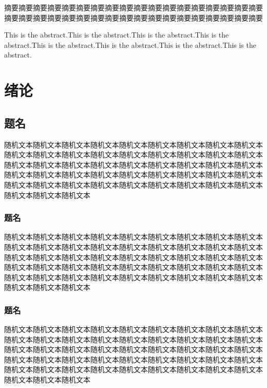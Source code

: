 \documentclass{paper}
\author{your name（三号宋体）}
\begin{document}
\maketitle
\announcement{}
\newpage
\begin{abstractcn}
摘要摘要摘要摘要摘要摘要摘要摘要摘要摘要摘要摘要摘要摘要摘要摘要摘要摘要摘要摘要摘要摘要摘要摘要摘要摘要摘要摘要摘要摘要摘要摘要摘要摘要摘要摘要

\end{abstractcn}
\newpage
{}
\begin{abstracten}
This is the abstract.This is the abstract.This is the abstract.This is the abstract.This is the abstract.This is the abstract.This is the abstract.This is the abstract.
\end{abstracten}
\newpage

{
    \xiaosihao \songti \tableofcontents
}
\newpage

\section{绪论}
\subsection{题名}
随机文本随机文本随机文本随机文本随机文本随机文本随机文本随机文本随机文本随机文本随机文本随机文本随机文本随机文本随机文本随机文本随机文本随机文本随机文本随机文本随机文本随机文本随机文本随机文本随机文本随机文本随机文本随机文本随机文本随机文本随机文本随机文本随机文本随机文本随机文本随机文本随机文本随机文本随机文本随机文本随机文本随机文本随机文本随机文本随机文本随机文本随机文本随机文本
\subsubsection{题名}
随机文本随机文本随机文本随机文本随机文本随机文本随机文本随机文本随机文本随机文本随机文本随机文本随机文本随机文本随机文本随机文本随机文本随机文本随机文本随机文本随机文本随机文本随机文本随机文本随机文本随机文本随机文本随机文本随机文本随机文本随机文本随机文本随机文本随机文本随机文本随机文本随机文本随机文本随机文本随机文本随机文本随机文本随机文本随机文本随机文本随机文本随机文本随机文本
\subsubsection{题名}
随机文本随机文本随机文本随机文本随机文本随机文本随机文本随机文本随机文本随机文本随机文本随机文本随机文本随机文本随机文本随机文本随机文本随机文本随机文本随机文本随机文本随机文本随机文本随机文本随机文本随机文本随机文本随机文本随机文本随机文本随机文本随机文本随机文本随机文本随机文本随机文本随机文本随机文本随机文本随机文本随机文本随机文本随机文本随机文本随机文本随机文本随机文本随机文本
\end{document}
